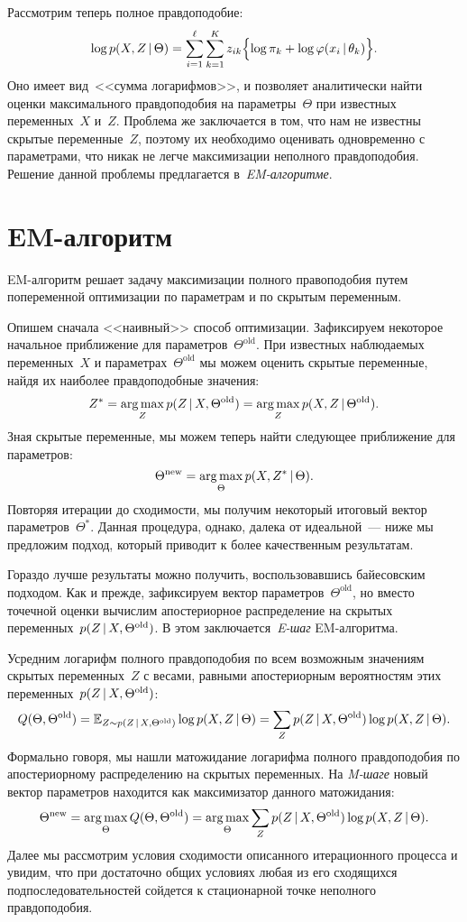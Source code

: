\documentclass[12pt,fleqn]{article}
\begin{document}
Рассмотрим теперь полное правдоподобие:
\[
    \log p(X, Z \mspace{3mu}{|}\mspace{3mu} \Theta)
    =
    \sum_{i = 1}^{\ell}
    \sum_{k = 1}^{K}
        z_{ik}
        \Bigl\{
            \log \pi_k
            +
            \log \varphi(x_i \mspace{3mu}{|}\mspace{3mu} \theta_k)
        \Bigr\}.
\]
Оно имеет вид~<<сумма логарифмов>>,
и позволяет аналитически найти оценки максимального правдоподобия
на параметры~$\Theta$ при известных переменных~$X$ и~$Z$.
Проблема же заключается в том, что нам не известны скрытые переменные~$Z$,
поэтому их необходимо оценивать одновременно с параметрами,
что никак не легче максимизации неполного правдоподобия.
Решение данной проблемы предлагается в~\emph{EM-алгоритме}.

\section{EM-алгоритм}
EM-алгоритм решает задачу максимизации полного правоподобия
путем попеременной оптимизации по параметрам и по скрытым переменным.

Опишем сначала <<наивный>> способ оптимизации.
Зафиксируем некоторое начальное приближение для параметров~$\Theta^\text{old}$.
При известных наблюдаемых переменных~$X$ и параметрах~$\Theta^\text{old}$
мы можем оценить скрытые переменные, найдя их наиболее правдоподобные значения:
\[
    Z^*
    =
    \mathop{\rm arg\,max}\limits_{Z} p(Z \mspace{3mu}{|}\mspace{3mu} X, \Theta^\text{old})
    =
    \mathop{\rm arg\,max}\limits_{Z} p(X, Z \mspace{3mu}{|}\mspace{3mu} \Theta^\text{old}).
\]
Зная скрытые переменные, мы можем теперь найти следующее приближение для параметров:
\[
    \Theta^\text{new}
    =
    \mathop{\rm arg\,max}\limits_{\Theta} p(X, Z^* \mspace{3mu}{|}\mspace{3mu} \Theta).
\]
Повторяя итерации до сходимости, мы получим некоторый итоговый вектор параметров~$\Theta^*$.
Данная процедура, однако, далека от идеальной~--- ниже мы предложим подход, который
приводит к более качественным результатам.

Гораздо лучше результаты можно получить, воспользовавшись байесовским подходом.
Как и прежде, зафиксируем вектор параметров~$\Theta^\text{old}$,
но вместо точечной оценки вычислим апостериорное распределение на скрытых
переменных~$p(Z \mspace{3mu}{|}\mspace{3mu} X, \Theta^\text{old})$.
В этом заключается~\emph{E-шаг} EM-алгоритма.

Усредним логарифм полного правдоподобия по всем возможным значениям
скрытых переменных~$Z$ с весами, равными апостериорным вероятностям
этих переменных~$p(Z \mspace{3mu}{|}\mspace{3mu} X, \Theta^\text{old})$:
\[
    Q(\Theta, \Theta^\text{old})
    =
    \mathbb{E}_{Z \sim p(Z \mspace{3mu}{|}\mspace{3mu} X, \Theta^\text{old})}
        \log p(X, Z \mspace{3mu}{|}\mspace{3mu} \Theta)
    =
    \sum_{Z}
        p(Z \mspace{3mu}{|}\mspace{3mu} X, \Theta^\text{old})
        \log p(X, Z \mspace{3mu}{|}\mspace{3mu} \Theta).
\]
Формально говоря, мы нашли матожидание логарифма полного правдоподобия
по апостериорному распределению на скрытых переменных.
На \emph{M-шаге} новый вектор параметров находится как максимизатор данного матожидания:
\[
    \Theta^\text{new}
    =
    \mathop{\rm arg\,max}\limits_{\Theta} Q(\Theta, \Theta^\text{old})
    =
    \mathop{\rm arg\,max}\limits_{\Theta}
    \sum_{Z}
        p(Z \mspace{3mu}{|}\mspace{3mu} X, \Theta^\text{old})
        \log p(X, Z \mspace{3mu}{|}\mspace{3mu} \Theta).
\]
Далее мы рассмотрим условия сходимости описанного итерационного процесса
и увидим, что при достаточно общих условиях любая
из его сходящихся подпоследовательностей сойдется к стационарной точке
неполного правдоподобия.
\end{document}

